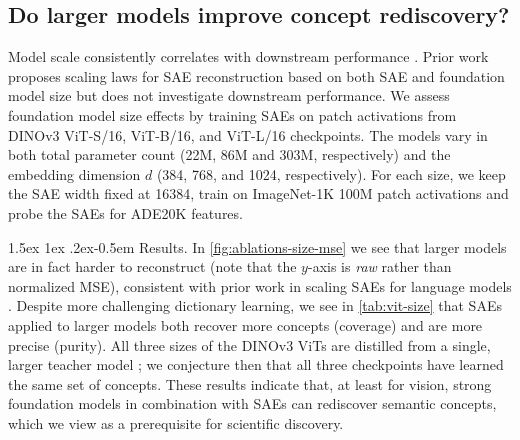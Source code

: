 \documentclass[10pt,twocolumn,letterpaper]{article}
\makeatletter
\newcommand{\todo}[1]{\textbf{\color{red}[TODO: #1]}}
\newcommand{\sam}[1]{\textbf{\color{blue}[Sam: #1]}}
\newcommand{\jake}[1]{\textbf{\color{green}[Jake: #1]}}
\renewcommand{\paragraph}{%
  \@startsection{paragraph}{4}%
  {\z@}{1.5ex \@plus 1ex \@minus .2ex}{-0.5em}%
  {\normalfont\normalsize\bfseries}%
}
\makeatother
\begin{document}
\subsection{Do larger models improve concept rediscovery?}\label{sec:ablation-size}
Model scale consistently correlates with downstream performance \citep{kaplan2020scaling,hoffmann2022training}. 
Prior work proposes scaling laws for SAE reconstruction based on both SAE and foundation model size \citep{gao2025scaling} but does not investigate downstream performance.
We assess foundation model size effects by training SAEs on patch activations from DINOv3 ViT-S/16, ViT-B/16, and ViT-L/16 checkpoints.
The models vary in both total parameter count (\num{22}M, \num{86}M and \num{303}M, respectively) and the embedding dimension $d$ (\num{384}, \num{768}, and \num{1024}, respectively).
For each size, we keep the SAE width fixed at \num{16384}, train on ImageNet-1K \num{100}M patch activations and probe the SAEs for ADE20K features.


\paragraph{Results.}
In \cref{fig:ablations-size-mse} we see that larger models are in fact harder to reconstruct (note that the $y$-axis is \textit{raw} rather than normalized MSE), consistent with prior work in scaling SAEs for language models \citep{gao2025scaling}.
Despite more challenging dictionary learning, we see in \cref{tab:vit-size} that SAEs applied to larger models both recover more concepts (coverage) and are more precise (purity).
All three sizes of the DINOv3 ViTs are distilled from a single, larger teacher model \citep{simeoni2025dinov3}; we conjecture then that all three checkpoints have learned the same set of concepts.
These results indicate that, at least for vision, strong foundation models in combination with SAEs can rediscover semantic concepts, which we view as a prerequisite for scientific discovery.
\end{document}
